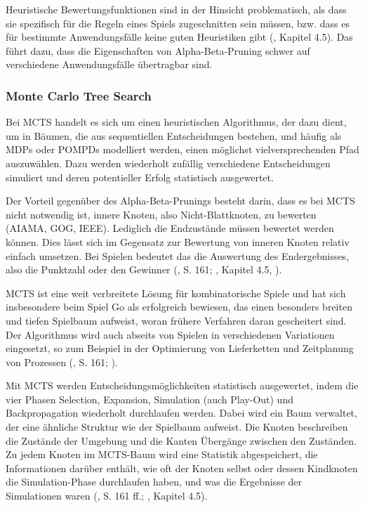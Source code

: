 Heuristische Bewertungsfunktionen sind in der Hinsicht problematisch, als dass sie spezifisch für die Regeln eines Spiels zugeschnitten sein müssen, bzw. dass es für bestimmte Anwendungsfälle keine guten Heuristiken gibt (\cite{Ferguson.January2019}, Kapitel 4.5). Das führt dazu, dass die Eigenschaften von Alpha-Beta-Pruning schwer auf verschiedene Anwendungsfälle übertragbar sind.

\subsubsection{Monte Carlo Tree Search}

Bei MCTS handelt es sich um einen heuristischen Algorithmus, der dazu dient, um in Bäumen, die aus sequentiellen Entscheidungen bestehen, und häufig als MDPs oder POMPDs modelliert werden, einen möglichst vielversprechenden Pfad auszuwählen. Dazu werden wiederholt zufällig verschiedene Entscheidungen simuliert und deren potentieller Erfolg statistisch ausgewertet.

Der Vorteil gegenüber des Alpha-Beta-Prunings besteht darin, dass es bei MCTS nicht notwendig ist, innere Knoten, also Nicht-Blattknoten, zu bewerten (AIAMA, GOG, IEEE). Lediglich die Endzustände müssen bewertet werden können. Dies lässt sich im Gegensatz zur Bewertung von inneren Knoten relativ einfach umsetzen. Bei Spielen bedeutet das die Auswertung des Endergebnisses, also die Punktzahl oder den Gewinner (\cite{Russell.2020}, S. 161; \cite{Ferguson.January2019}, Kapitel 4.5, \cite{Browne.2012}).

MCTS ist eine weit verbreitete Lösung für kombinatorische Spiele und hat sich insbesondere beim Spiel Go als erfolgreich bewiesen, das einen besonders breiten und tiefen Spielbaum aufweist, woran frühere Verfahren daran gescheitert sind. Der Algorithmus wird auch abseits von Spielen in verschiedenen Variationen eingesetzt, so zum Beispiel in der Optimierung von Lieferketten und Zeitplanung von Prozessen (\cite{Russell.2020}, S. 161; \cite{Browne.2012}).


Mit MCTS werden Entscheidungsmöglichkeiten statistisch ausgewertet, indem die vier Phasen Selection, Expansion, Simulation (auch Play-Out) und Backpropagation wiederholt durchlaufen werden. Dabei wird ein Baum verwaltet, der eine ähnliche Struktur wie der Spielbaum aufweist. Die Knoten beschreiben die Zustände der Umgebung und die Kanten Übergänge zwischen den Zuständen. Zu jedem Knoten im MCTS-Baum wird eine Statistik abgespeichert, die Informationen darüber enthält, wie oft der Knoten selbst oder dessen Kindknoten die Simulation-Phase durchlaufen haben, und was die Ergebnisse der Simulationen waren (\cite{Russell.2020}, S. 161 ff.; \cite{Ferguson.January2019}, Kapitel 4.5).

